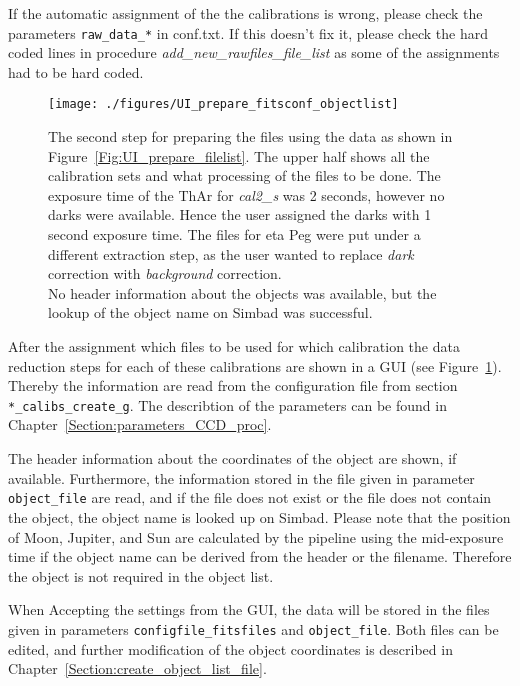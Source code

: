 \documentclass[10pt,a4paper]{article}
\begin{document}
\noindent If the automatic assignment of the the calibrations is wrong, please check the parameters \verb|raw_data_*| in conf.txt. If this doesn't fix it, please check the hard coded lines in procedure \textit{add\_new\_rawfiles\_file\_list} as some of the assignments had to be hard coded.

\begin{figure} 
  \begin{center}
    \texttt{[image: ./figures/UI\_prepare\_fitsconf\_objectlist]}
  \end{center} 
  \caption{The second step for preparing the files using the data as shown in Figure~\ref{Fig:UI_prepare_filelist}. The upper half shows all the calibration sets and what processing of the files to be done. The exposure time of the ThAr for \textit{cal2\_s} was 2 seconds, however no darks were available. Hence the user assigned the darks with 1 second exposure time. The files for eta Peg were put under a different extraction step, as the user wanted to replace \textit{dark} correction with \textit{background} correction. \\
    No header information about the objects was available, but the lookup of the object name on Simbad was successful.
    \label{Fig:UI_prepare_fitsconf_objectlist}}
\end{figure}

After the assignment which files to be used for which calibration the data reduction steps for each of these calibrations are shown in a GUI (see Figure~\ref{Fig:UI_prepare_fitsconf_objectlist}). Thereby the information are read from the configuration file from section \verb|*_calibs_create_g|. The describtion of the parameters can be found in Chapter~\ref{Section:parameters_CCD_proc}.

\noindent The header information about the coordinates of the object are shown, if available. Furthermore, the information stored in the file given in parameter \verb|object_file| are read, and if the file does not exist or the file does not contain the object, the object name is looked up on Simbad. Please note that the position of Moon, Jupiter, and Sun are calculated by the pipeline using the mid-exposure time if the object name can be derived from the header or the filename. Therefore the object is not required in the object list.

\noindent When Accepting the settings from the GUI, the data will be stored in the files given in parameters \verb|configfile_fitsfiles| and \verb|object_file|. Both files can be edited, and further modification of the object coordinates is described in Chapter~\ref{Section:create_object_list_file}.
\end{document}
